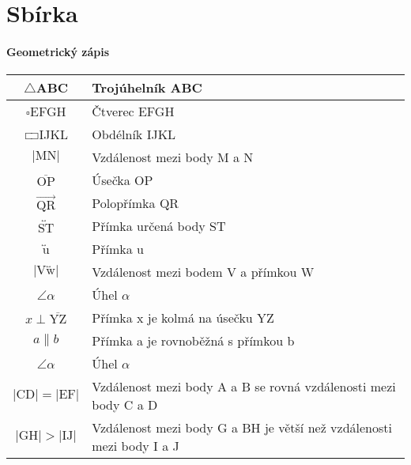 \chapter{Sbírka}

\subsubsection{Geometrický zápis}
\begin{tabular}{|c|l|}
    \hline
    $\triangle$ABC                                         & Trojúhelník ABC                                                      \\ \hline
    $\square$EFGH                                          & Čtverec EFGH                                                         \\ \hline
    $\rectangle$IJKL                                       & Obdélník IJKL                                                        \\ \hline
    $\lvert \text{MN} \rvert$                              & Vzdálenost mezi body M a N                                           \\ \hline
    $\overline{\text{OP}}$                                 & Úsečka OP                                                            \\ \hline
    $\overrightarrow{\text{QR}}$                           & Polopřímka QR                                                        \\ \hline
    $\overleftrightarrow{\text{ST}}$                       & Přímka určená body ST                                                \\ \hline
    $\overleftrightarrow{\text{u}}$                        & Přímka u                                                             \\ \hline
    $\lvert \text{V} \overleftrightarrow{\text{w}} \rvert$ & Vzdálenost mezi bodem V a přímkou W                                  \\ \hline
    $\angle \alpha $                                       & Úhel $\alpha$                                                        \\ \hline
    $ x \perp \overline{\text{YZ}} $                       & Přímka x je kolmá na úsečku YZ                                       \\ \hline
    $a \| b$                                               & Přímka a je rovnoběžná s přímkou b                                   \\ \hline
    $\angle \alpha $                                       & Úhel $\alpha$                                                        \\ \hline
    $\lvert \text{CD} \rvert = \lvert \text{EF} \rvert$    & Vzdálenost mezi body A a B se rovná vzdálenosti mezi body C a D      \\ \hline
    $\lvert \text{GH} \rvert > \lvert \text{IJ} \rvert$    & Vzdálenost mezi body G a BH je větší než vzdálenosti mezi body I a J \\ \hline
\end{tabular}

\newpage
